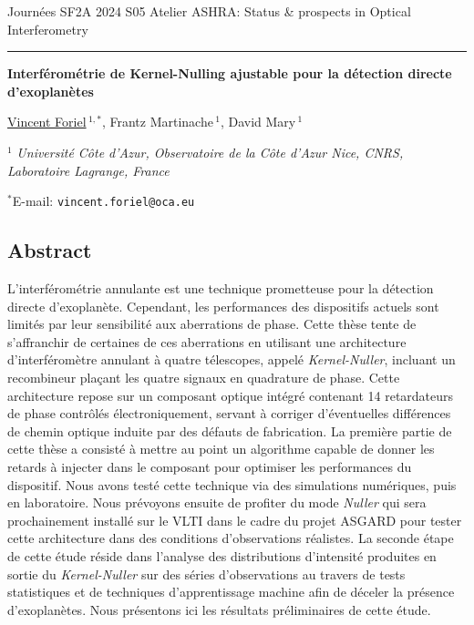 \documentclass[12pt]{article}
\begin{document}
Journées SF2A 2024
\hfill
S05 Atelier ASHRA: Status \& prospects in Optical Interferometry

\smallskip
\hrule

\bigskip

\begin{center}
\LARGE \bf Interférométrie de Kernel-Nulling ajustable pour la détection directe d’exoplanètes\rm

\vspace{0.5cm}

\large  \underline{Vincent Foriel}$\,^{1,*}$, \large Frantz Martinache$\,^1$, \large David Mary$\,^1$

\vspace{0.5cm}

\normalsize

$^1$ \textit{Université Côte d’Azur, Observatoire de la Côte d’Azur Nice, CNRS, Laboratoire Lagrange, France}

\vspace{0.3cm}
$^*$E-mail: {\tt vincent.foriel@oca.eu}

\end{center}
\vspace{-0.8cm}
\subsection*{\Large Abstract}

L'interférométrie annulante est une technique prometteuse pour la détection directe d'exoplanète. Cependant, les performances des dispositifs actuels sont limités par leur sensibilité aux aberrations de phase. Cette thèse tente de s'affranchir de certaines de ces aberrations en utilisant une architecture d'interféromètre annulant à quatre télescopes, appelé {\it Kernel-Nuller}\cite{Chingaipe et al. 2022}, incluant un recombineur plaçant les quatre signaux en quadrature de phase. Cette architecture repose sur un composant optique intégré contenant 14 retardateurs de phase contrôlés électroniquement, servant à corriger d'éventuelles différences de chemin optique induite par des défauts de fabrication. La première partie de cette thèse a consisté à mettre au point un algorithme capable de donner les retards à injecter dans le composant pour optimiser les performances du dispositif. Nous avons testé cette technique via des simulations numériques, puis en laboratoire. Nous prévoyons ensuite de profiter du mode {\it Nuller} qui sera prochainement installé sur le VLTI dans le cadre du projet ASGARD pour tester cette architecture dans des conditions d'observations réalistes. La seconde étape de cette étude réside dans l'analyse des distributions d'intensité produites en sortie du {\it Kernel-Nuller}\cite{Chingaipe et al. 2022, Cvetojevic et al. 2022} sur des séries d’observations au travers de tests statistiques et de techniques d’apprentissage machine afin de déceler la présence d'exoplanètes. Nous présentons ici les résultats préliminaires de cette étude.
\end{document}
